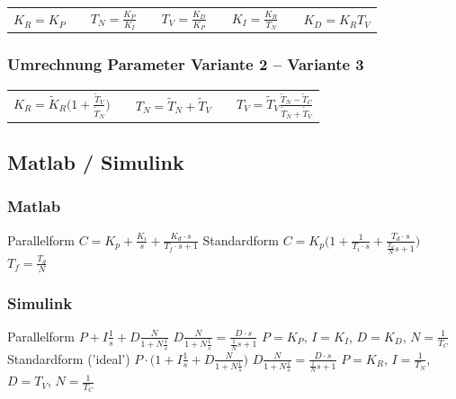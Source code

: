 \begin{tabular}{c c c c c c c c c}
    $K_R = K_P$ & & $T_N = \frac{K_P}{K_I}$ & & $T_V = \frac{K_D}{K_P}$ & & $K_I = \frac{K_R}{T_N}$ & & $ K_D = K_R T_V$
\end{tabular}

\subsubsection{Umrechnung Parameter Variante 2 -- Variante 3}

\begin{tabular}{c c c c c}
    $K_R = \tilde{K}_R \Big( 1 + \frac{\tilde{T}_V}{\tilde{T}_N} \Big)$ & &
    $T_N = \tilde{T}_N + \tilde{T}_V$ & &
    $T_V = \tilde{T}_V \frac{\tilde{T}_N - \tilde{T}_C}{\tilde{T}_N + \tilde{T}_V}$ 
\end{tabular}

\subsection{Matlab / Simulink}

\begin{minipage}[t]{0.45\columnwidth}
    \subsubsection*{Matlab}

    \begin{outline}
        \1 Parallelform
            \2 
            \2 $C = K_p + \frac{K_i}{s} + \frac{K_d \cdot s}{T_f \cdot s + 1}$
        \1 Standardform
            \2 
            \2 $C = K_p \Big( 1 + \frac{1}{T_i \cdot s} + \frac{T_d \cdot s}{\frac{T_d}{N} s + 1} \Big)$
            \2 $T_f = \frac{T_d}{N}$
    \end{outline}
\end{minipage}
\hfill
\begin{minipage}[t]{0.53\columnwidth}
    \subsubsection*{Simulink}

    \begin{outline}
        \1 Parallelform
        \2 $P + I \frac{1}{s} + D \frac{N}{1 + N \frac{1}{s}}$
        \2 $D \frac{N}{1 + N \frac{1}{s}} = \frac{D \cdot s}{\frac{1}{N} s + 1}$
        \2 $P = K_P$, $I = K_I$, $D = K_D$, $N = \frac{1}{T_C}$
    \1 Standardform ('ideal')
        \2 $P \cdot \Big( 1 + I \frac{1}{s} + D \frac{N}{1 + N \frac{1}{s}} \Big)$
        \2 $D \frac{N}{1 + N \frac{1}{s}} = \frac{D \cdot s}{\frac{1}{N} s + 1}$
        \2 $P = K_R$, $I = \frac{1}{T_N}$, $D = T_V$, $N = \frac{1}{T_C}$
    \end{outline}
\end{minipage}


